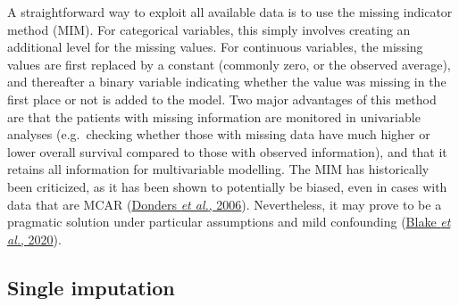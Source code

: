 \documentclass[
  letterpaper,
  DIV=11,
  numbers=noendperiod]{scrreprt}
\begin{document}
A straightforward way to exploit all available data is to use the
missing indicator method (MIM). For categorical variables, this simply
involves creating an additional level for the missing values. For
continuous variables, the missing values are first replaced by a
constant (commonly zero, or the observed average), and thereafter a
binary variable indicating whether the value was missing in the first
place or not is added to the model. Two major advantages of this method
are that the patients with missing information are monitored in
univariable analyses (e.g.~checking whether those with missing data have
much higher or lower overall survival compared to those with observed
information), and that it retains all information for multivariable
modelling. The MIM has historically been criticized, as it has been
shown to potentially be biased, even in cases with data that are MCAR
(\protect\hyperlink{ref-dondersReviewGentleIntroduction2006}{Donders
\emph{et al.}, 2006}). Nevertheless, it may prove to be a pragmatic
solution under particular assumptions and mild confounding
(\protect\hyperlink{ref-blakeEstimatingTreatmentEffects2020}{Blake
\emph{et al.}, 2020}).

\hypertarget{single-imputation}{%
\subsection{Single imputation}\label{single-imputation}}
\end{document}
